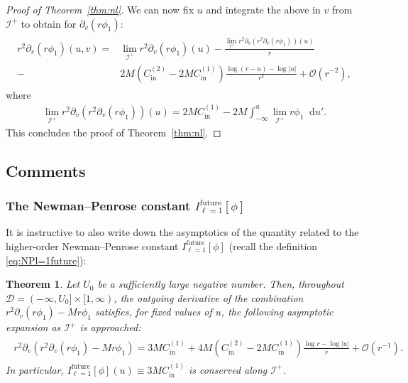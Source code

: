 \documentclass[11pt,english]{article}
\numberwithin{equation}{section}
\newtheorem{thm}{Theorem}[section]
\theoremstyle{remark}
\theoremstyle{plain}
\theoremstyle{remark}
\newcommand{\dd}{\mathop{}\!\mathrm{d}}
\newcommand{\pv}{\partial_v}
\renewcommand{\(}{\left(}
\renewcommand{\)}{\right)}
\newcommand{\cc}{C_{\mathrm{in}}^{(1)}}
\newcommand{\ccc}{C_{\mathrm{in}}^{(2)}}
\newcommand{\pho}{(r\phi_1)}
\newcommand{\ILn}[1]{I_{\ell=#1}^{\mathrm{future}}}
\begin{document}
\begin{proof}[Proof of Theorem~\ref{thm:nl}]
We can now fix $u$ and integrate the above in $v$ from $\mathcal I^+$ to obtain for $\pv\pho$:
\begin{align}
\begin{split}
r^2\pv\pho(u,v)=&\lim_{\mathcal{I}^+}r^2\pv\pho(u)-\frac{\lim_{\mathcal{I}^+ }r^2\pv(r^2\pv\pho)(u)}{r}\\
-&2M(\ccc-2M\cc)\frac{\log (v-u)-\log|u|}{r^2}+\mathcal{O}(r^{-2}),
\end{split}
\end{align}
where
\begin{align*}
\lim_{\mathcal{I}^+ }r^2\pv(r^2\pv\pho)(u)=2M\cc-2M\int_{-\infty}^u\lim_{\mathcal{I}^+}r\phi_1\dd u'.
\end{align*}
This concludes the proof of Theorem~\ref{thm:nl}.
\end{proof}

\subsection{Comments}\label{sec:nl:comments}
\subsubsection{The Newman--Penrose constant \texorpdfstring{$\ILn1[\phi]$}{I[phi]}}
It is instructive to also write down the asymptotics of the quantity related to the higher-order Newman--Penrose constant $\ILn1[\phi]$ (recall the definition \eqref{eq:NPl=1future}):
\begin{thm}\label{thm:NP}
Let $U_0$ be a sufficiently large negative number. Then, throughout $\mathcal{D}=(-\infty,U_0]\times [1,\infty)$, the outgoing derivative of the combination $r^2\pv\pho-Mr\phi_1$ satisfies, for fixed values of $u$, the following asymptotic expansion as $\mathcal{I}^+$ is approached:
\begin{align}
\begin{split}
r^2\pv(r^2\pv\pho-Mr\phi_1)=3M\cc+4M(\ccc-2M\cc)\frac{\log r-\log|u|}{r}+\mathcal{O}(r^{-1}).
\end{split}
\end{align}
In particular, $\ILn1[\phi](u)\equiv 3M\cc$ is conserved along $\mathcal{I}^+$.
\end{thm}
\end{document}
